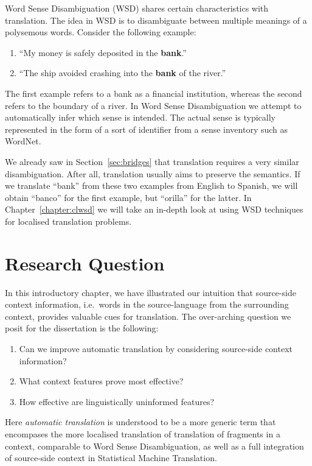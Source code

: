 Word Sense Disambiguation (WSD) shares certain characteristics with
translation. The idea in WSD is to disambiguate between multiple meanings of a
polysemous words. Consider the following example: 

\begin{enumerate}
\item ``My money is safely deposited in the \textbf{bank}.''
\item ``The ship avoided crashing into the \textbf{bank} of the river.''
\end{enumerate}

The first example refers to a bank as a financial institution, whereas the
second refers to the boundary of a river. In Word Sense Disambiguation we
attempt to automatically infer which sense is intended. The actual sense is
typically represented in the form of a sort of identifier from a sense inventory
such as WordNet.

We already saw in Section~\ref{sec:bridges} that translation requires a very
similar disambiguation. After all, translation usually aims to preserve the
semantics. If we translate ``bank'' from these two examples from English to
Spanish, we will obtain ``banco'' for the first example, but ``orilla'' for the
latter. In Chapter~\ref{chapter:clwsd} we will take an in-depth look at using
WSD techniques for localised translation problems.

\section{Research Question}
\label{sec:overallresearchquestion}

In this introductory chapter, we have illustrated our intuition that
source-side context information, i.e.\ words in the source-language from the
surrounding context, provides valuable cues for translation. The over-arching
question we posit for the dissertation is the following:

\begin{enumerate}
\item Can we improve automatic translation by considering source-side context information? 
\item What context features prove most effective?
\item How effective are linguistically uninformed features?
\end{enumerate}

Here \emph{automatic translation} is understood to be a more generic term that
encompases the more localised translation of translation of fragments in a
context, comparable to Word Sense Disambiguation, as well as a full integration
of source-side context in Statistical Machine Translation.

